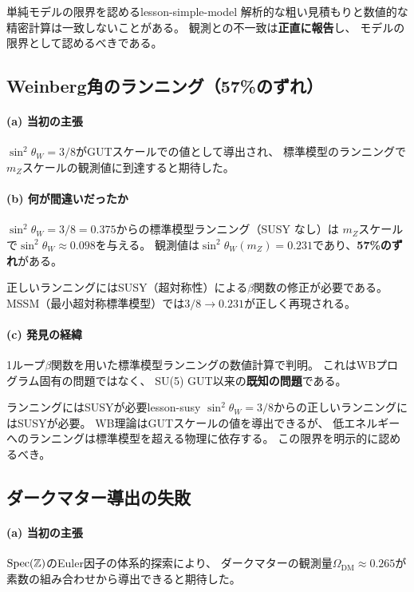 \begin{keylesson}{単純モデルの限界を認める}{lesson-simple-model}
解析的な粗い見積もりと数値的な精密計算は一致しないことがある。
観測との不一致は\textbf{正直に報告}し、
モデルの限界として認めるべきである。
\end{keylesson}


\subsection{Weinberg角のランニング（57\%のずれ）}
\label{sec:15.5}

\paragraph{(a) 当初の主張}
$\sin^2\theta_W = 3/8$がGUTスケールでの値として導出され、
標準模型のランニングで$m_Z$スケールの観測値に到達すると期待した。

\paragraph{(b) 何が間違いだったか}
$\sin^2\theta_W = 3/8 = 0.375$からの標準模型ランニング（SUSY なし）は
$m_Z$スケールで$\sin^2\theta_W \approx 0.098$を与える。
観測値は$\sin^2\theta_W(m_Z) = 0.231$であり、\textbf{57\%のずれ}がある。

正しいランニングにはSUSY（超対称性）による$\beta$関数の修正が必要である。
MSSM（最小超対称標準模型）では$3/8 \to 0.231$が正しく再現される。

\paragraph{(c) 発見の経緯}
1ループ$\beta$関数を用いた標準模型ランニングの数値計算で判明。
これはWBプログラム固有の問題ではなく、
SU(5) GUT以来の\textbf{既知の問題}である。

\begin{keylesson}{ランニングにはSUSYが必要}{lesson-susy}
$\sin^2\theta_W = 3/8$からの正しいランニングにはSUSYが必要。
WB理論はGUTスケールの値を導出できるが、
低エネルギーへのランニングは標準模型を超える物理に依存する。
この限界を明示的に認めるべき。
\end{keylesson}


\subsection{ダークマター導出の失敗}
\label{sec:15.6}

\paragraph{(a) 当初の主張}
$\operatorname{Spec}(\mathbb{Z})$のEuler因子の体系的探索により、
ダークマターの観測量$\Omega_{\mathrm{DM}} \approx 0.265$が
素数の組み合わせから導出できると期待した。

